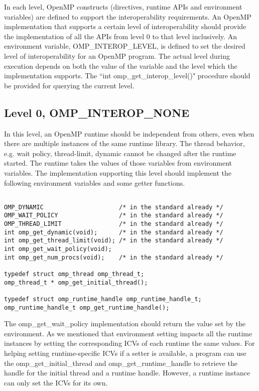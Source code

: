 In each level, 
OpenMP constructs (directives, runtime APIs and environment variables) are defined to support the interoperability 
requirements. 
An OpenMP implementation that supports a certain level of interoperability should provide the implementation of all the APIs
from level 0 to that level inclusively. 
An environment variable, {\sf OMP\_INTEROP\_LEVEL}, is defined to set the desired level of 
interoperability for an OpenMP program. The actual level during execution depends on both the value of 
the variable and the level which the implementation supports. 
The ``{\sf int omp\_get\_interop\_level()}" procedure should be provided for querying the current level. %

\subsection{Level 0, OMP\_INTEROP\_NONE}
In this level, an OpenMP runtime should be independent from others, even when there are multiple instances of the same runtime library. 
The thread behavior, e.g. wait policy, thread-limit, dynamic cannot be changed after the runtime started.
The runtime takes the values of those variables from environment variables. The implementation supporting 
this level should implement the following  
environment variables and some getter functions. 
\lstset{basicstyle=\sffamily\footnotesize,language=c, numbersep=1pt}
\begin{lstlisting}[frame=single]  % Start your code-block

OMP_DYNAMIC                     /* in the standard already */
OMP_WAIT_POLICY                 /* in the standard already */
OMP_THREAD_LIMIT                /* in the standard already */
int omp_get_dynamic(void);      /* in the standard already */
int omp_get_thread_limit(void); /* in the standard already */
int omp_get_wait_policy(void);
int omp_get_num_procs(void);    /* in the standard already */

typedef struct omp_thread omp_thread_t;
omp_thread_t * omp_get_initial_thread();

typedef struct omp_runtime_handle omp_runtime_handle_t;
omp_runtime_handle_t omp_get_runtime_handle();
\end{lstlisting}
The {\sf omp\_get\_wait\_policy} implementation should return the value set by the environment. 
As we mentioned that environment setting impacts all the runtime instances by setting the corresponding
ICVs of each runtime the same values. For helping setting runtime-specific ICVs if a setter is available, a program
can use the {\sf omp\_get\_initial\_thread} and {\sf  omp\_get\_runtime\_handle} to retrieve the handle for the
initial thread and a runtime handle. However, a runtime instance can only set the ICVs for its own. 

